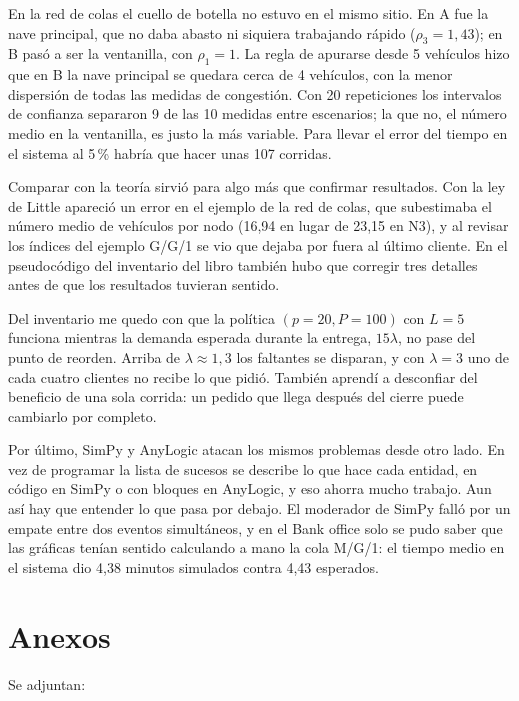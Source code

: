 \documentclass[11pt,letterpaper]{article}
\begin{document}
En la red de colas el cuello de botella no estuvo en el mismo sitio. En A fue la nave principal, que no daba
abasto ni siquiera trabajando rápido ($\rho_3 = 1{,}43$); en B pasó a ser la ventanilla, con $\rho_1 = 1$. La regla
de apurarse desde 5 vehículos hizo que en B la nave principal se quedara cerca de 4 vehículos, con la menor
dispersión de todas las medidas de congestión. Con 20 repeticiones los intervalos de confianza separaron 9 de
las 10 medidas entre escenarios; la que no, el número medio en la ventanilla, es justo la más variable. Para
llevar el error del tiempo en el sistema al 5\,\% habría que hacer unas 107 corridas.

Comparar con la teoría sirvió para algo más que confirmar resultados. Con la ley de Little apareció un error en el ejemplo de
la red de colas, que subestimaba el número medio de vehículos por nodo (16,94 en lugar de 23,15 en N3), y al
revisar los índices del ejemplo G/G/1 se vio que dejaba por fuera al último cliente. En el pseudocódigo del
inventario del libro también hubo que corregir tres detalles antes de que los resultados tuvieran sentido.

Del inventario me quedo con que la política $(p = 20, P = 100)$ con $L = 5$ funciona mientras la demanda esperada
durante la entrega, $15\lambda$, no pase del punto de reorden. Arriba de $\lambda \approx 1{,}3$ los faltantes se
disparan, y con $\lambda = 3$ uno de cada cuatro clientes no recibe lo que pidió. También aprendí a desconfiar del
beneficio de una sola corrida: un pedido que llega después del cierre puede cambiarlo por completo.

Por último, SimPy y AnyLogic atacan los mismos problemas desde otro lado. En vez de programar la lista de sucesos
se describe lo que hace cada entidad, en código en SimPy o con bloques en AnyLogic, y eso ahorra mucho trabajo.
Aun así hay que entender lo que pasa por debajo. El moderador de SimPy falló por un empate entre dos eventos
simultáneos, y en el Bank office solo se pudo saber que las gráficas tenían sentido calculando a mano la cola
M/G/1: el tiempo medio en el sistema dio 4,38 minutos simulados contra 4,43 esperados.

\section{Anexos}

Se adjuntan:
\end{document}
